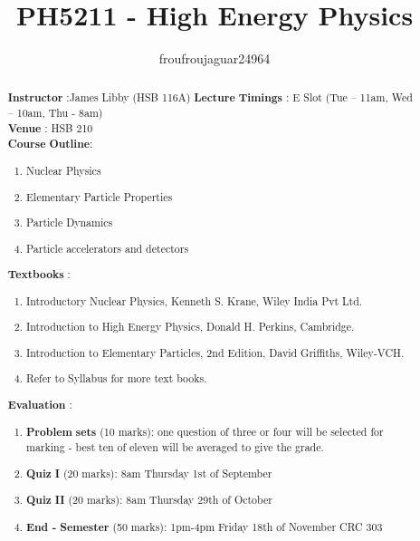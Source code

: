 \documentclass[a4paper]{report}
\author{froufroujaguar24964}
\title{PH5211 - High Energy Physics}
\begin{document}
\maketitle

\begin{abstract}
	\textbf{Instructor} :James Libby (HSB 116A)
	\textbf{Lecture}  \textbf{Timings} : E Slot (Tue – 11am, Wed – 10am, Thu - 8am)\\
	\textbf{Venue} : HSB 210\\
	\textbf{Course}  \textbf{Outline}: \\
	\begin{enumerate}
	\item Nuclear Physics
	\item Elementary Particle Properties
	\item Particle Dynamics
	\item Particle accelerators and detectors
	\end{enumerate}
	
	\textbf{Text}\textbf{books} :
	\begin{enumerate}
		\item Introductory Nuclear Physics, Kenneth S. Krane, Wiley India Pvt Ltd.
		\item Introduction to High Energy Physics, Donald H. Perkins, Cambridge.
		\item Introduction to Elementary Particles, 2nd Edition, David Griffiths, Wiley-VCH.
		\item Refer to Syllabus for more text books.
	\end{enumerate}
	\textbf{Evaluation} :
	\begin{enumerate}
		\item \textbf{Problem}  \textbf{sets} (10 marks): one question of three or four will be selected for marking - best ten of eleven will be averaged to give the grade.
		\item \textbf{Quiz} \textbf{I}  (20 marks): 8am Thursday 1st of September
		\item \textbf{Quiz} \textbf{II}  (20 marks): 8am Thursday 29th of October
		\item \textbf{End -} \textbf{Semester}  (50 marks): 1pm-4pm Friday 18th of November CRC 303
	\end{enumerate}
\end{abstract}

\newpage

\tableofcontents


\newpage
\appendix
\appendixpage



\newpage
\printbibliography
\end{document}
